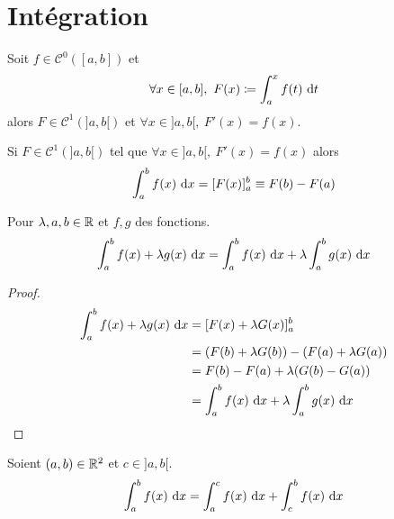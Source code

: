 \chapter{Intégration}

\begin{theorem}
	Soit $f \in \mathcal{C}^0([a, b])$ et 
	\begin{align*}
		\forall x \in [a,b],\ F(x) \coloneqq \int_a^x f(t) \ \diffd t
	\end{align*}
	alors $F \in \mathcal{C}^1(]a, b[)$ et $\forall x \in ]a, b[,\ F'(x) = f(x)$.    
\end{theorem}

\begin{corollary}
    Si $F \in \mathcal{C}^1(]a, b[)$ tel que $\forall x \in ]a, b[,\ F'(x) = f(x)$ alors
	\begin{align*}
		\int_a^b f(x) \ \diffd x = [F(x)]_a^b \equiv F(b) - F(a) 
	\end{align*}
\end{corollary}

\begin{proposition}
	Pour $\lambda, a, b \in \mathbb{R}$ et $f, g$ des fonctions.
	\begin{align*}
		\int_a^b f(x) + \lambda g(x) \ \diffd x = \int_a^b f(x) \ \diffd x + \lambda \int_a^b g(x) \ \diffd x 
	\end{align*}
\end{proposition}

\begin{proof}
    \begin{align*}
        \int_{a}^{b} f(x) + \lambda g(x) \ \diffd x &= [F(x) + \lambda G(x)]_a^b \\
                                                    &= (F(b) + \lambda G(b)) - (F(a) + \lambda G(a)) \\
                                                    &= F(b) - F(a) + \lambda (G(b) - G(a)) \\
                                                    &= \int_{a}^{b} f(x) \ \diffd x + \lambda \int_{a}^{b} g(x) \ \diffd x
    \end{align*}
\end{proof}

\begin{proposition}
	Soient $(a, b) \in \mathbb{R}^2$ et $c \in ]a, b[$.
	\begin{align*}
		\int_a^b f(x) \ \diffd x = \int_a^c f(x) \ \diffd x + \int_c^b f(x) \ \diffd x
	\end{align*}
\end{proposition}

